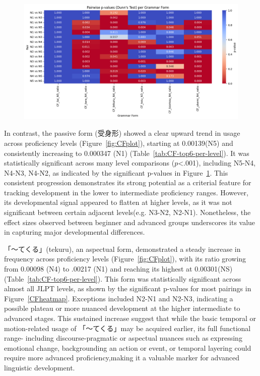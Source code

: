 \begin{figure}[h!]
\centering
\includegraphics[scale=.4]{img/CFheatmap}
\caption[Heatmap of top 5 grammar forms]{}
\label{fig:CFheatmap}
\end{figure}
In
contrast, the
passive form (受身形) showed a clear upward trend in usage across proficiency levels (Figure~\ref{fig:CFplot}),
starting at 0.00139(N5) and consistently increasing to 0.000347 (N1) (Table~\ref{tab:CF-top6-per-level}). It was statistically
significant
across many level comparisons ($p$<.001), including N5-N4, N4-N3, N4-N2, as indicated by the significant p-values in
Figure~\ref{fig:CFheatmap}. This consistent progression demonstrates its strong potential as a criterial feature
for
tracking
development in the lower to intermediate
proficiency ranges. However, its developmental signal appeared to flatten at higher levels, as it was not significant
between certain adjacent levels(e.g. N3-N2, N2-N1). Nonetheless, the effect sizes observed between beginner
and advanced groups underscores its value in capturing major developmental differences.

「〜てくる」(tekuru), an aspectual form, demonstrated a steady increase in frequency across proficiency
levels (Figure~\ref{fig:CFplot}), with its ratio growing from 0.00098 (N4) to .00217 (N1) and reaching
its highest at 0.00301(NS) (Table~\ref{tab:CF-top6-per-level}). This form was
statistically significant across almost all JLPT levels, as shown by the significant p-values for most pairings in
Figure~\ref{CFheatmap}. Exceptions included N2-N1 and N2-N3, indicating a possible plateau or more nuanced
development at the higher intermediate to advanced stages. This sustained increase suggest that while the basic
temporal or motion-related usage of 「〜てくる」may be acquired earlier, its full functional range- including
discourse-pragmatic or aspectual nuances such as expressing emotional change, backgrounding an action or event, or
temporal layering could require more advanced proficiency,making it a valuable marker for advanced linguistic
development.

